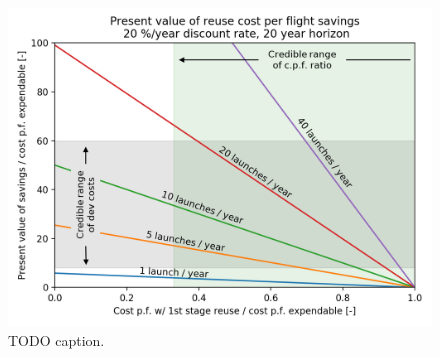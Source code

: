 \documentclass[conf]{new-aiaa}
\begin{document}
\begin{figure}[hbt!]
    \centering
    \includegraphics[width=\textwidth]{reuse_npv}
    \caption{\label{fig:reuse_npv} TODO caption.}
\end{figure}


\end{document}
